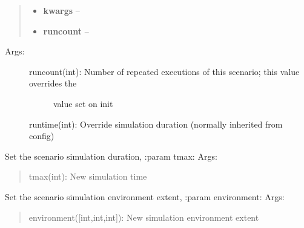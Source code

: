 \documentclass[letterpaper,10pt,english]{sphinxmanual}
\begin{document}
\begin{fulllineitems}
\begin{fulllineitems}
\begin{quote}
\begin{description}
\begin{itemize}
\item {} 
\textbf{kwargs} -- 

\item {} 
\textbf{runcount} -- 

\end{itemize}

\end{description}\end{quote}
\begin{description}
\item[{Args:}] \leavevmode\begin{description}
\item[{runcount(int): Number of repeated executions of this scenario; this value overrides the}] \leavevmode
value set on init

\end{description}

runtime(int): Override simulation duration (normally inherited from config)

\end{description}

\end{fulllineitems}


\begin{fulllineitems}
\label{index:polybos.Scenario.set_duration}
Set the scenario simulation duration,
:param tmax:
Args:
\begin{quote}

tmax(int): New simulation time
\end{quote}

\end{fulllineitems}


\begin{fulllineitems}
\label{index:polybos.Scenario.set_environment}
Set the scenario simulation environment extent,
:param environment:
Args:
\begin{quote}

environment({[}int,int,int{]}): New simulation environment extent
\end{quote}

\end{fulllineitems}


\end{fulllineitems}
\end{document}
